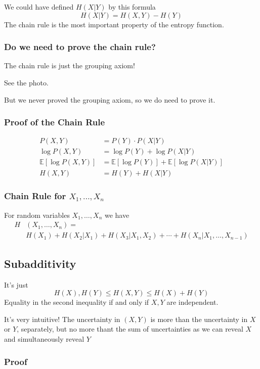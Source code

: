\documentclass{article}
\begin{document}
We could have defined $H(X|Y)$ by this formula 
\[
H(X|Y) = H(X,Y) - H(Y)
\]
The chain rule is the most important property of the entropy function.

\subsubsection{Do we need to prove the chain rule?}

The chain rule is just the grouping axiom!

See the photo.

But we never proved the grouping axiom, so we do need to prove it.

\subsubsection{Proof of the Chain Rule}

\begin{align*}
    P(X,Y) &= P(Y)\cdot P(X|Y)\\
    \log P(X,Y) &= \log P(Y) + \log P(X|Y)\\
    \mathbb{E} \left[\log P(X,Y) \right]&= \mathbb{E}\left[\log P(Y)\right] + \mathbb{E}\left[\log P(X|Y)\right]\\
    H(X,Y) &=H(Y) + H(X|Y)
\end{align*}

\subsubsection{Chain Rule for $X_1,\ldots,X_n$}
For random variables $X_1,\ldots,X_n$ we have 
\begin{align*}
    H&(X_1,\ldots,X_n)=\\
    &H(X_1) + H(X_2|X_1) + H(X_3|X_1,X_2) + \cdots + H(X_n|X_1,\ldots,X_{n-1})
\end{align*}

\subsection{Subadditivity}
It's just 
\[
H(X),H(Y)\leq H(X,Y)\leq H(X) + H(Y)
\]
Equality in the second inequality if and only if $X,Y$ are independent.

It's very intuitive! The uncertainty in $(X,Y)$ is more than the uncertainty in $X$ or $Y$, separately, but no more thant the sum of uncertainties as we can reveal $X$ and simultaneously reveal $Y$

\subsubsection{Proof}
\end{document}
